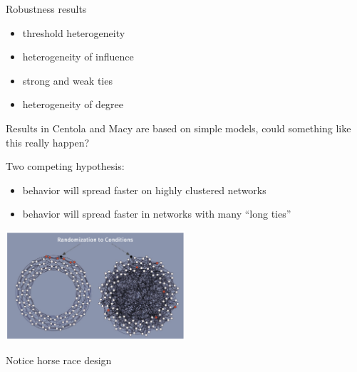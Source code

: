 \documentclass[aspectratio=169]{beamer}
\begin{document}
\begin{frame}

Robustness results
\begin{itemize}
\item threshold heterogeneity
\item heterogeneity of influence
\item strong and weak ties
\item heterogeneity of degree
\end{itemize} 

\end{frame}
\begin{frame}

Results in Centola and Macy are based on simple models, could something like this really happen?

\end{frame}
\begin{frame}

\setcounter{subfigure}{0}
\begin{figure}
  \centering
  \hspace{0in}
\end{figure}


\end{frame}
\begin{frame}

Two competing hypothesis:
\begin{itemize}
\item behavior will spread faster on highly clustered networks 
\item behavior will spread faster in networks with many ``long ties'' 
\end{itemize}

\begin{center}
\includegraphics[width=0.5\textwidth]{figures/centola_spread_2010_fig1}
\end{center}


\vfill
Notice horse race design
\end{frame}
\end{document}
